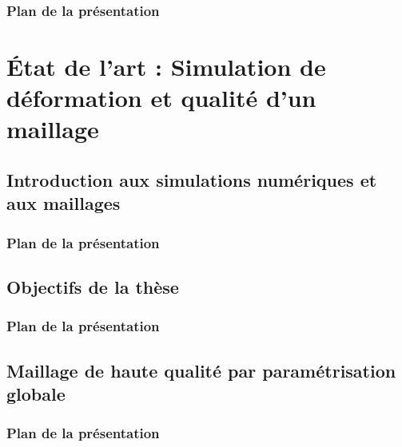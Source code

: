 \documentclass{beamer}
\begin{document}
\begin{frame}
    \frametitle{Plan de la présentation}
    \tableofcontents[currentsection, sectionstyle=show/show, subsectionstyle=show/hide/hide]
\end{frame}

\section{État de l'art : Simulation de déformation et qualité d'un maillage}

\subsection{Introduction aux simulations numériques et aux maillages}
\begin{frame}
    \frametitle{Plan de la présentation}
    \tableofcontents[currentsubsection, sectionstyle=show/shaded, subsectionstyle=show/shaded/hide]
\end{frame}


\subsection{Objectifs de la thèse}
\begin{frame}
    \frametitle{Plan de la présentation}
    \tableofcontents[currentsubsection, sectionstyle=show/shaded, subsectionstyle=show/shaded/hide]
\end{frame}


\subsection{Maillage de haute qualité par paramétrisation globale}
\begin{frame}
    \frametitle{Plan de la présentation}
    \tableofcontents[currentsubsection, sectionstyle=show/shaded, subsectionstyle=show/shaded/hide]
\end{frame}

\end{document}
